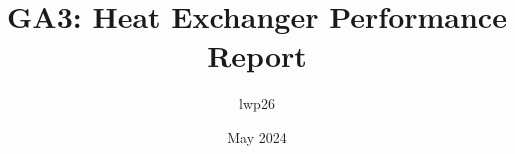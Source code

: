 \documentclass{article}
\begin{document}
\title{GA3: Heat Exchanger Performance Report}
\author{lwp26}
\date{May 2024}
\maketitle 
\end{document}

